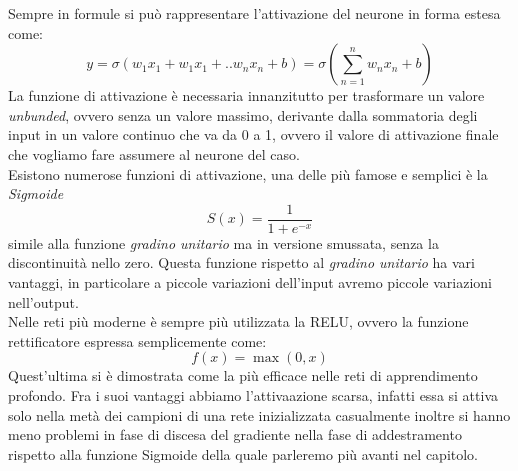 \documentclass[12pt,a4paper,openright,twoside]{report}
\begin{document}
Sempre in formule si può rappresentare l'attivazione del neurone in forma estesa come: 
\begin{equation}
    y = \sigma(w_1  x_1 + w_1  x_1 + .. w_n  x_n + b) = \sigma(\sum_{n=1}^{n} w_n x_n + b)
\end{equation}
La funzione di attivazione è necessaria innanzitutto per trasformare un valore \emph{unbunded}, ovvero senza un valore massimo, derivante dalla sommatoria degli input in un valore continuo che va da 0 a 1, ovvero il valore di attivazione finale che vogliamo fare assumere al neurone del caso. \\
Esistono numerose funzioni di attivazione, una delle più famose e semplici è la \emph{Sigmoide} \[ S(x) = \frac{1}{1+e^{-x}}\] simile alla funzione \emph{gradino unitario} ma in versione smussata, senza la discontinuità nello zero. Questa funzione rispetto al \emph{gradino unitario} ha vari vantaggi, in particolare a piccole variazioni dell'input avremo piccole variazioni nell'output. \\
Nelle reti più moderne è sempre più utilizzata la RELU, ovvero la funzione rettificatore espressa semplicemente come: 
\begin{equation}
     f(x)=\max(0,x)
\end{equation}
Quest'ultima si è dimostrata come la più efficace nelle reti di apprendimento profondo. Fra i suoi vantaggi abbiamo l'attivaazione scarsa, infatti essa si attiva solo nella metà dei campioni di una rete inizializzata casualmente inoltre si hanno meno problemi in fase di discesa del gradiente nella fase di addestramento rispetto alla funzione Sigmoide della quale parleremo più avanti nel capitolo.
\end{document}
